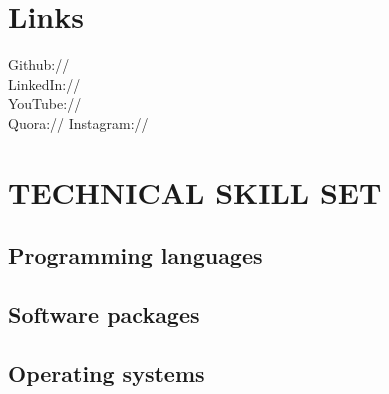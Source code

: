 \documentclass[]{deedy-resume-openfont}
\begin{document}
\begin{minipage}[t]{0.33\textwidth}
\section{Links} 
Github:// \href{https://github.com/InnovativeCoder}{} \\
LinkedIn://  \href{https://www.linkedin.com/in/jasneet-singh-sawhney-707944110/}{} \\
YouTube://  \href{https://www.youtube.com/channel/UCKQOUcqLLQXWLKUAQbfKiNQ}{} \\
Quora://  \href{https://www.quora.com/profile/Jasneet-Singh-Sawhney}{}
Instagram:// \href{https://www.instagram.com/innovative_coder/}{}
\sectionsep
\sectionsep

\section{TECHNICAL SKILL SET}

\subsection{Programming languages}
\sectionsep

\subsection{Software packages}
\sectionsep

\subsection{Operating systems}





\setlength{\columnsep}{1in}


%
%

\end{minipage} 
\hfill
\end{document}
